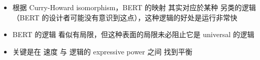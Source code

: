 \documentclass[16pt]{beamer}
\newcommand{\cc}[2]{#1}
\newcommand{\cc}[2]{#2}
\newcommand{\emp}[1]{{\color{violet}#1}}
\begin{document}
\begin{frame}
\begin{itemize}
\item \cc{根据 Curry-Howard isomorphism，BERT 的映射  其实对应於某种 \emp{另类的逻辑}（BERT 的设计者可能没有意识到这点），这种逻辑的好处是运行\emp{非常快}}
{By the Curry-Howard isomorphism, BERT's mapping corresponds to some kind of \emp{alternative logic} (BERT's creators may not have recognized this), which has \emp{very fast} execution}

\item \cc{BERT 的逻辑 看似有局限，但这种表面的局限未必阻止它是 universal 的逻辑}
{BERT's logic seems highly restricted, but the superficial restrictions may not prevent it from being a \emp{universal} logic}

\item \cc{关键是在 速度 与 逻辑的 expressive power 之间 找到平衡}
{The key is to find a balance between speed and expressive power of the logic}
\end{itemize}
\end{frame}
\end{document}

